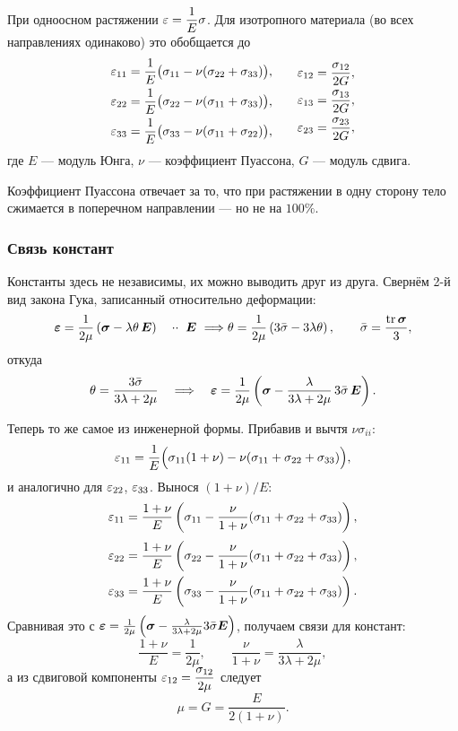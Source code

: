 При одноосном растяжении $\varepsilon = \dfrac{1}{E}\sigma$. Для изотропного материала
(во всех направлениях одинаково) это обобщается до
\[
  \begin{aligned}
    \varepsilon_{11} &= \frac{1}{E}\bigl(\sigma_{11} - \nu(\sigma_{22} + \sigma_{33})\bigr), \\
    \varepsilon_{22} &= \frac{1}{E}\bigl(\sigma_{22} - \nu(\sigma_{11} + \sigma_{33})\bigr), \\
    \varepsilon_{33} &= \frac{1}{E}\bigl(\sigma_{33} - \nu(\sigma_{11} + \sigma_{22})\bigr),
  \end{aligned}
  \qquad
  \begin{aligned}
    \varepsilon_{12} &= \frac{\sigma_{12}}{2G}, \\
    \varepsilon_{13} &= \frac{\sigma_{13}}{2G}, \\
    \varepsilon_{23} &= \frac{\sigma_{23}}{2G},
  \end{aligned}
\]
где $E$ — модуль Юнга, $\nu$ — коэффициент Пуассона, $G$ — модуль сдвига.

Коэффициент Пуассона отвечает за то, что при растяжении в одну сторону тело
сжимается в поперечном направлении — но не на $100\%$.

\subsubsection*{Связь констант}

Константы здесь не независимы, их можно выводить друг из друга. Свернём 2-й вид
закона Гука, записанный относительно деформации:
\[
  \boldsymbol{\varepsilon} = \frac{1}{2\mu}\left(\boldsymbol{\sigma} - \lambda\theta\,\boldsymbol{E}\right)
  \quad \mathbin{\cdot\cdot}\ \boldsymbol{E} \ \Longrightarrow\\
  \theta = \frac{1}{2\mu}\left(3\bar\sigma - 3\lambda\theta\right),
  \qquad \bar\sigma = \frac{\operatorname{tr} \boldsymbol{\sigma}}{3} ,
\]
откуда
\[
  \theta = \frac{3\bar\sigma}{3\lambda + 2\mu}
  \quad\Longrightarrow\quad
  \boldsymbol{\varepsilon} = \frac{1}{2\mu}\left(\boldsymbol{\sigma} - \frac{\lambda}{3\lambda+2\mu}\,3\bar\sigma\,\boldsymbol{E}\right).
\]

Теперь то же самое из инженерной формы. Прибавив и вычтя $\nu\sigma_{ii}$:
\[
  \varepsilon_{11} = \frac{1}{E}\Bigl(\sigma_{11}(1+\nu) - \nu(\sigma_{11}+\sigma_{22}+\sigma_{33})\Bigr),
\]
и аналогично для $\varepsilon_{22}$, $\varepsilon_{33}$. Вынося $(1+\nu)/E$:
\[
  \varepsilon_{11} = \frac{1+\nu}{E}\left(\sigma_{11} - \frac{\nu}{1+\nu}(\sigma_{11}+\sigma_{22}+\sigma_{33})\right),
\]
\[
  \begin{aligned}
    \varepsilon_{22} &= \frac{1+\nu}{E}\left(\sigma_{22} - \frac{\nu}{1+\nu}(\sigma_{11}+\sigma_{22}+\sigma_{33})\right), \\
    \varepsilon_{33} &= \frac{1+\nu}{E}\left(\sigma_{33} - \frac{\nu}{1+\nu}(\sigma_{11}+\sigma_{22}+\sigma_{33})\right).
  \end{aligned}
\]
Сравнивая это с $\boldsymbol{\varepsilon} = \frac{1}{2\mu}\left(\boldsymbol{\sigma} - \frac{\lambda}{3\lambda+2\mu}3\bar\sigma\boldsymbol{E}\right)$,
получаем связи для констант:
\[
  \frac{1+\nu}{E} = \frac{1}{2\mu} ,
  \qquad
  \frac{\nu}{1+\nu} = \frac{\lambda}{3\lambda + 2\mu} ,
\]
а из сдвиговой компоненты $\varepsilon_{12} = \dfrac{\sigma_{12}}{2\mu}$ следует
\[
  \mu = G = \frac{E}{2(1+\nu)} .
\]

